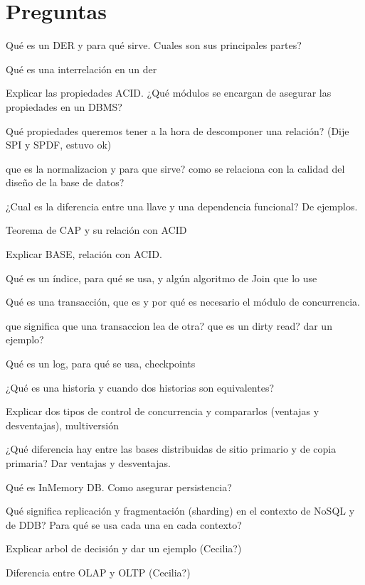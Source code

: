\chapter{Preguntas}


Qué es un DER y para qué sirve. Cuales son sus principales partes?

Qué es una interrelación en un der

Explicar las propiedades ACID. ¿Qué módulos se encargan de asegurar las propiedades en un DBMS?

Qué propiedades queremos tener a la hora de descomponer una relación? (Dije SPI y SPDF, estuvo ok)

que es la normalizacion y para que sirve? como se relaciona con la calidad del diseño de la base de datos?

¿Cual es la diferencia entre una llave y una dependencia funcional? De ejemplos.

Teorema de CAP y su relación con ACID

Explicar BASE, relación con ACID.

Qué es un índice, para qué se usa, y algún algoritmo de Join que lo use

Qué es una transacción, que es y por qué es necesario el módulo de concurrencia.

que significa que una transaccion lea de otra? que es un dirty read? dar un ejemplo?

Qué es un log, para qué se usa, checkpoints

¿Qué es una historia y cuando dos historias son equivalentes?

Explicar dos tipos de control de concurrencia y compararlos (ventajas y desventajas), multiversión

¿Qué diferencia hay entre las bases distribuidas de sitio primario y de copia primaria? Dar ventajas y desventajas.

Qué es InMemory DB. Como asegurar persistencia?

Qué significa replicación y fragmentación (sharding) en el contexto de NoSQL y de DDB? Para qué se usa cada una en cada contexto?

Explicar arbol de decisión y dar un ejemplo (Cecilia?)

Diferencia entre OLAP y OLTP (Cecilia?)
